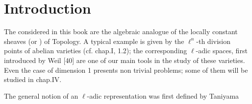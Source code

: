 \chapter*{Introduction}
The  considered in this book
are the algebraic analogue of the locally constant sheaves
(or ) of Topology. A typical example
is given by the $\ell^n$-th division points of abelian varieties
(cf. chap.I, 1.2); the corresponding $\ell$-adic spaces, first
introduced by Weil [40] are one of our main tools in the
study of these varieties. Even the case of dimension 1
presents non trivial problems; some of them will be
studied in chap.IV.

The general notion of an $\ell$-adic representation was
first defined by Taniyama
